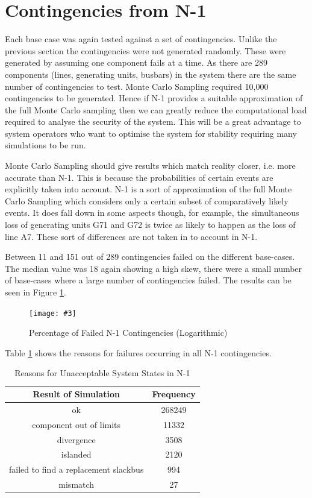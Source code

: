 \documentclass[a4paper,oneside,12pt]{report}
\newcommand{\image}[3] {
  \begin{figure}
    \begin{center}
      \texttt{[image: \#3]}
      \caption{#2}
      \label{#1}
    \end{center}
  \end{figure}
}
\begin{document}
\section{Contingencies from N-1}

Each base case was again tested against a set of contingencies. Unlike the previous section the contingencies were not generated randomly. These were generated by assuming one component fails at a time. As there are 289 components (lines, generating units, busbars) in the system there are the same number of contingencies to test. Monte Carlo Sampling required 10,000 contingencies to be generated. Hence if N-1 provides a suitable approximation of the full Monte Carlo sampling then we can greatly reduce the computational load required to analyse the security of the system. This will be a great advantage to system operators who want to optimise the system for stability requiring many simulations to be run. 

Monte Carlo Sampling should give results which match reality closer, i.e. more accurate than N-1. This is because the probabilities of certain events are explicitly taken into account. N-1 is a sort of approximation of the full Monte Carlo Sampling which considers only a certain subset of comparatively likely events. It does fall down in some aspects though, for example, the simultaneous loss of generating units G71 and G72 is twice as likely to happen as the loss of line A7. These sort of differences are not taken in to account in N-1. 

Between 11 and 151 out of 289 contingencies failed on the different base-cases. The median value was 18 again showing a high skew, there were a small number of base-cases where a large number of contingencies failed. The results can be seen in Figure \ref{nxlogunacceptable}. 

\image{nxlogunacceptable}{Percentage of Failed N-1 Contingencies (Logarithmic)}{nxlogunacceptable.png}

Table \ref{table_failure_reasons_n1} shows the reasons for failures occurring in all N-1 contingencies.

\begin{table}[htbp]
\caption{Reasons for Unacceptable System States in N-1}
\label{table_failure_reasons_n1}
\centering
\begin{tabular}{c||c}
\bfseries Result of Simulation & \bfseries Frequency \\
\hline \hline
ok & 268249 \\ 
component out of limits & 11332 \\ 
divergence & 3508 \\ 
islanded & 2120 \\ 
failed to find a replacement slackbus & 994 \\ 
mismatch & 27 \\ 
\hline
\end{tabular}
\end{table}
\end{document}
